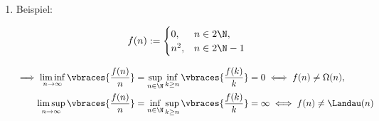\begin{solution}
\begin{enumerate}[label = (\alph*)]
  \item Beispiel:

  \begin{align*}
    f(n)
    :=
    \begin{cases}
      0,   & n \in 2 \N, \\
      n^2, & n \in 2 \N - 1
    \end{cases}
  \end{align*}

  \begin{align*}
    \implies
    \liminf_{n \to \infty}
    \vbraces
    {
      \frac{f(n)}{n}
    }
    & =
    \sup_{n \in \N}
    \inf_{k \geq n}
    \vbraces
    {
      \frac{f(k)}{k}
    }
    =
    0
    \iff
    f(n) \neq \Omega(n), \\
    \limsup_{n \to \infty}
    \vbraces
    {
      \frac{f(n)}{n}
    }
    & =
    \inf_{n \in \N}
    \sup_{k \geq n}
    \vbraces
    {
      \frac{f(k)}{k}
    }
    =
    \infty
    \iff
    f(n) \neq \Landau(n)
  \end{align*}

\end{enumerate}

\end{solution}

